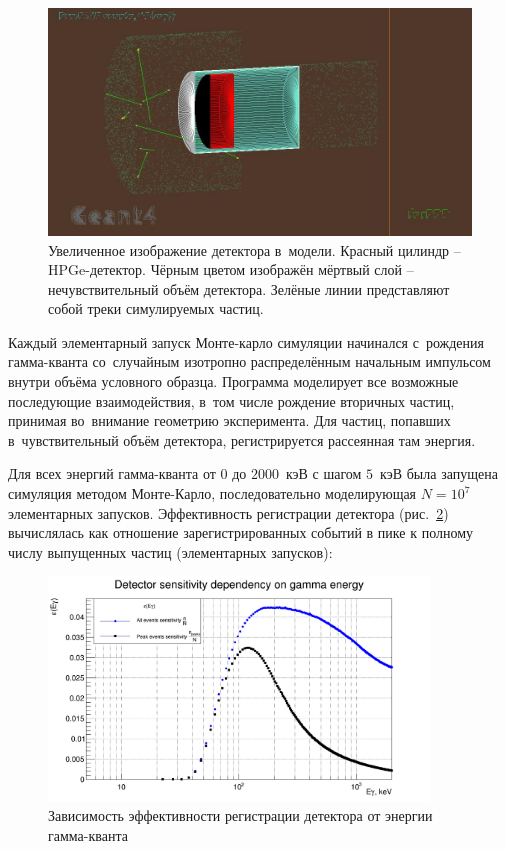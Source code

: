 \documentclass[a4paper,article,14pt]{extarticle}
\begin{document}
\begin{figure}[t]
    \centering
    \includegraphics[width=.9\textwidth]{images/Tracks.jpg}
    \caption{Увеличенное изображение детектора в~модели.
    Красный цилиндр -- HPGe-детектор. Чёрным цветом изображён мёртвый слой -- нечувствительный объём детектора.
    Зелёные линии представляют собой треки симулируемых частиц.}\label{fig:tracks}
\end{figure}

Каждый элементарный запуск Монте-карло симуляции начинался с~рождения гамма-кванта со~случайным изотропно распределённым начальным импульсом внутри объёма условного образца.
Программа моделирует все возможные последующие взаимодействия, в~том числе рождение вторичных частиц, принимая во~внимание геометрию эксперимента.
Для частиц, попавших в~чувствительный объём детектора, регистрируется рассеянная там энергия.

Для всех энергий гамма-кванта от $0$ до $2000$~кэВ с шагом $5$~кэВ была запущена симуляция методом Монте-Карло, последовательно моделирующая $N = 10^7$ элементарных запусков.
Эффективность регистрации детектора (рис.~\ref{fig:Ey}) вычислялась как отношение зарегистрированных событий в пике к полному числу выпущенных частиц (элементарных запусков):
\begin{figure}[t]
    \centering
    \includegraphics[width = 0.9\textwidth]{images/DetSens.png}
    \caption{Зависимость эффективности регистрации детектора от энергии гамма-кванта}\label{fig:Ey}
\end{figure}
\end{document}
